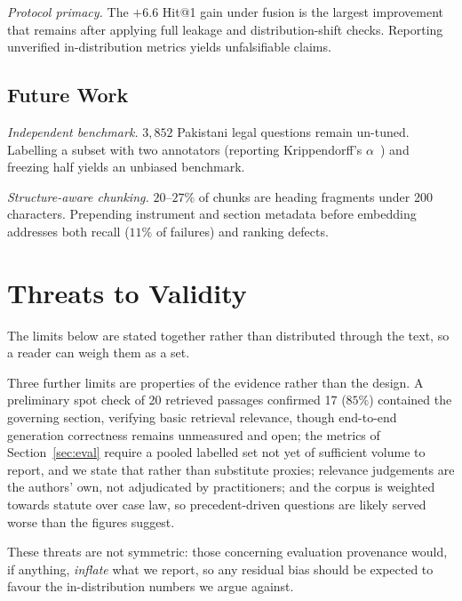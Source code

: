\documentclass[conference]{IEEEtran}
\begin{document}
\emph{Protocol primacy.} The $+6.6$ Hit@1 gain under fusion is the largest
improvement that remains after applying full leakage and distribution-shift checks.
Reporting unverified in-distribution metrics yields unfalsifiable claims.

\subsection{Future Work}
\label{sec:future}
\emph{Independent benchmark.} $3{,}852$ Pakistani legal questions remain un-tuned.
Labelling a subset with two annotators (reporting Krippendorff's $\alpha$~\cite{krippendorff2004})
and freezing half yields an unbiased benchmark.

\emph{Structure-aware chunking.} $20$--$27\%$ of chunks are heading fragments under
200 characters. Prepending instrument and section metadata before embedding addresses
both recall ($11\%$ of failures) and ranking defects.

\vspace{-2mm}
\section{Threats to Validity}
\label{sec:threats}
The limits below are stated together rather than distributed through the text,
so a reader can weigh them as a set.



Three further limits are properties of the evidence rather than the design. A
preliminary spot check of 20 retrieved passages confirmed 17 ($85\%$) contained
the governing section, verifying basic retrieval relevance, though end-to-end
generation correctness remains unmeasured and open; the metrics of Section~\ref{sec:eval}
require a pooled labelled set not yet of sufficient volume to report, and we state that
rather than substitute proxies; relevance judgements are the authors' own, not adjudicated
by practitioners; and the corpus is weighted towards statute over case law, so precedent-driven
questions are likely served worse than the figures suggest.

These threats are not symmetric: those concerning evaluation provenance would,
if anything, \emph{inflate} what we report, so any residual bias should be
expected to favour the in-distribution numbers we argue against.

\vspace{-4mm}
\end{document}
